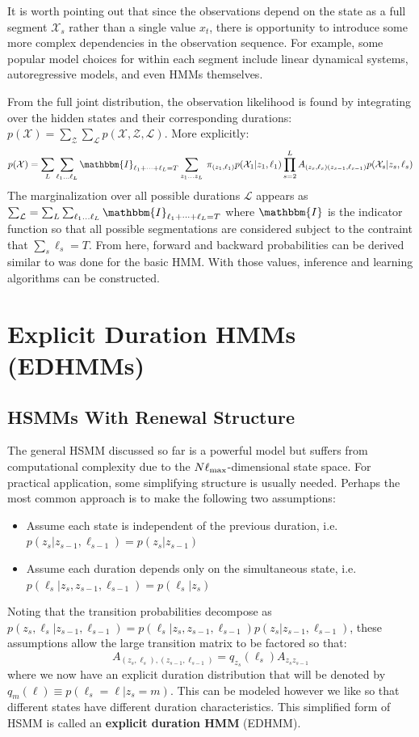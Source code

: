 \documentclass[onecolumn]{gwclass}
\begin{document}
	It is worth pointing out that since the observations depend on the state as a full segment $\mathcal{X}_s$ rather than a single value $x_t$, there is opportunity to introduce some more complex dependencies in the observation sequence. For example, some popular model choices for within each segment include linear dynamical systems, autoregressive models, and even HMMs themselves.
	
	From the full joint distribution, the observation likelihood is  found by integrating over the hidden states and their corresponding durations: $p(\mathcal{X}) = \sum_\mathcal{Z}\sum_\mathcal{L}p(\mathcal{X},\mathcal{Z},\mathcal{L})$. More explicitly:
	$$ p(\mathcal{X}) = \sum_L\sum_{\ell_1\dots\ell_L}\mathbbm{I}_{\ell_1+\dots+\ell_L=T}\sum_{z_1\dots z_L} \:\pi_{(z_1,\ell_1)}p(\mathcal{X}_1|z_1,\ell_1)\prod_{s=2}^L A_{(z_s,\ell_s)(z_{s-1},\ell_{s-1})}p(\mathcal{X}_s|z_s,\ell_s) $$
	The marginalization over all possible durations $\mathcal{L}$ appears as $\sum_\mathcal{L} =\sum_L\sum_{\ell_1\dots\ell_L}\mathbbm{I}_{\ell_1+\dots+\ell_L=T}$ where $\mathbbm{I}$ is the indicator function so that all possible segmentations are considered subject to the contraint that $\sum_s \ell_s = T$. From here, forward and backward probabilities can be derived similar to was done for the basic HMM. With those values, inference and learning algorithms can be constructed.
	
	
	\section{Explicit Duration HMMs (EDHMMs)}
	\subsection{HSMMs With Renewal Structure}
	The general HSMM discussed so far is a powerful model but suffers from computational complexity due to the $N\ell_{\text{\normalfont{max}}}$-dimensional state space. For practical application, some simplifying structure is usually needed. Perhaps the most common approach is to make the following two assumptions:
	\begin{itemize}
		\item Assume each state is independent of the previous duration, i.e. $p(z_s|z_{s-1},\ell_{s-1})=p(z_s|z_{s-1})$
		\item Assume each duration depends only on the simultaneous state, i.e. $p(\ell_s|z_s,z_{s-1},\ell_{s-1}) = p(\ell_s|z_s)$
	\end{itemize}
	Noting that the transition probabilities decompose as $p(z_s,\ell_s|z_{s-1},\ell_{s-1}) = p(\ell_s|z_s,z_{s-1},\ell_{s-1})p(z_s|z_{s-1},\ell_{s-1})$, these assumptions allow the large transition matrix to be factored so that:
	$$A_{(z_s,\ell_s),(z_{s-1},\ell_{s-1})} = q_{z_s}(\ell_s)A_{z_sz_{s-1}} $$
	where we now have an explicit duration distribution that will be denoted by $q_m(\ell)\equiv p(\ell_s=\ell|z_s=m)$. This can be modeled however we like so that different states have different duration characteristics. This simplified form of HSMM is called an \textbf{explicit duration HMM} (EDHMM).
	
\end{document}
